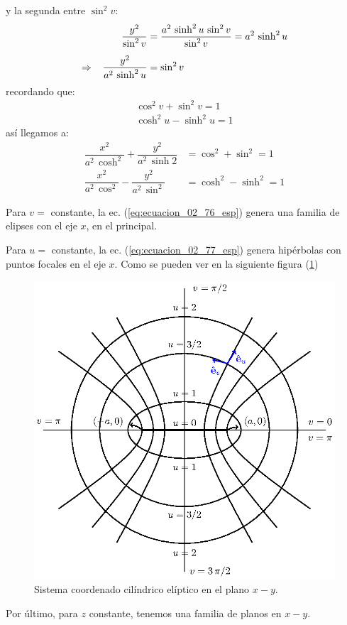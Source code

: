 \documentclass[12pt]{article}
\numberwithin{equation}{section}
\begin{document}
y la segunda entre $\sin^{2} v$:
\begin{align*}
\dfrac{y^{2}}{\sin^{2} v} &= \dfrac{a^{2} \, \sinh^{2} u \, \sin^{2} v}{\sin^{2} v} = a^{2} \, \sinh^{2} u  \\[0.5em]
\Rightarrow \hspace{0.3cm} \dfrac{y^{2}}{a^{2} \, \sinh^{2} u} &= \sin^{2} v
\end{align*}
recordando que:
\begin{align*}
\cos^{2} v + \sin^{2} v = 1 \\[0.5em]
\cosh^{2} u - \sinh^{2} u = 1
\end{align*}
así llegamos a:
\begin{align}
\dfrac{x^{2}}{a^{2} \, \cosh^{2}} + \dfrac{y^{2}}{a^{2} \, \sinh{2}} &= \cos^{2} + \sin^{2} = 1 \label{eq:ecuacion_02_76_esp}\\[1em]
\dfrac{x^{2}}{a^{2} \, \cos^{2}} - \dfrac{y^{2}}{a^{2} \, \sin^{2}} &= \cosh^{2} - \sinh^{2} = 1 \label{eq:ecuacion_02_77_esp}
\end{align}

Para $v=$ constante, la ec. (\ref{eq:ecuacion_02_76_esp}) genera una familia de elipses con el eje $x$, en el principal.
\par
Para $u=$ constante, la ec. (\ref{eq:ecuacion_02_77_esp}) genera hipérbolas con puntos focales en el eje $x$. Como se pueden ver en la siguiente figura (\ref{fig:figura_coordenada_cilindricas_elipticas})

\begin{figure}[H]
    \centering
    \includegraphics[scale=1]{Imagenes/Sistema_Cilindrico_Eliptico.eps}
    \caption{Sistema coordenado cilíndrico elíptico en el plano $x-y$.}
    \label{fig:figura_coordenada_cilindricas_elipticas}
\end{figure}
Por último, para $z$ constante, tenemos una familia de planos en $x - y$.
\end{document}
